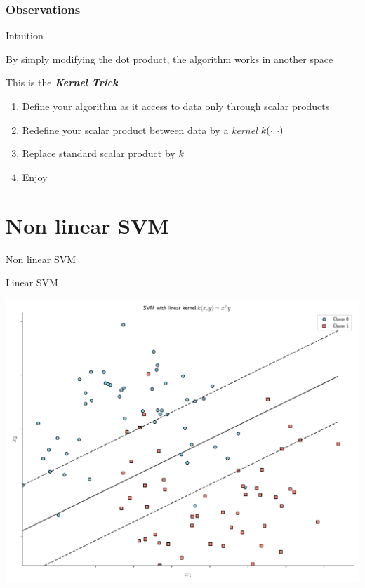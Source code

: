 \documentclass[11pt, pdf, compress, handout]{beamer}
\begin{document}
\begin{frame}
  \frametitle{Observations}
  \begin{block}{Intuition}
    \begin{center}
      By simply modifying the dot product, the algorithm works in another
      space
    \end{center}
  \end{block}

  \begin{block}{This is the \emph{\textbf{Kernel Trick}}}
    \begin{enumerate}
    \item Define your algorithm as it access to data only through scalar
      products
    \item Redefine your scalar product between data by a \emph{kernel}
      ${\mathnormal{k}}(\cdot,\cdot)$
    \item Replace standard scalar product by ${\mathnormal{k}}$
    \item Enjoy
    \end{enumerate}
  \end{block}
\end{frame}

\section{Non linear SVM}
\begin{frame}{Non linear SVM}
  \begin{block}{Linear SVM}
    \begin{center}
          \includegraphics[width=.8\textwidth]{./figures/svm_lineaire.pdf}
    \end{center}
\end{block}

\end{frame}
\end{document}
